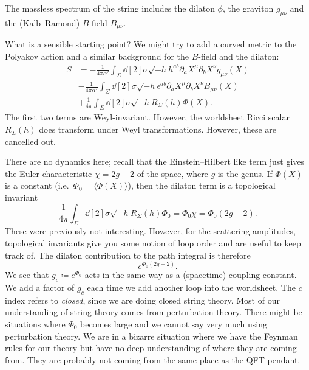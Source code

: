 The massless spectrum of the string includes the dilaton $\phi$, the graviton $g_{\mu\nu}$ and the (Kalb--Ramond) $B$-field $B_{\mu\nu}$.

What is a sensible starting point?
We might try to add a curved metric to the Polyakov action and a similar background for the $B$-field and the dilaton:
\begin{align}
  S &= -\frac{1}{4 \pi \alpha'} \int_\Sigma \dd[2]{\sigma} \sqrt{-h} h^{ab} \partial_{a} X^{\mu} \partial_{b} X^{\nu} g_{\mu\nu}(X) \\
    & -\frac{1}{4 \pi \alpha'} \int_{\Sigma} \dd[2]{\sigma} \sqrt{-h} \epsilon^{ab} \partial_{a} X^{\mu} \partial_{b} X^{\nu} B_{\mu\nu}(X) \\
    &+ \frac{1}{4 \pi} \int_{\Sigma} \dd[2]{\sigma} \sqrt{-h} R_{\Sigma}(h) \Phi(X).
\end{align}
The first two terms are Weyl-invariant. However, the worldsheet Ricci scalar $R_{\Sigma}(h)$ does transform under Weyl transformations. However, these are cancelled out.

There are no dynamics here; recall that the Einstein--Hilbert like term just gives the Euler characteristic $\chi = 2 g -2$ of the space, where $g$ is the genus.
If $\Phi(X)$ is a constant (i.e.~$\Phi_0 = \langle \Phi(X) \rangle$), then the dilaton term is a topological invariant
\begin{equation}
  \frac{1}{4 \pi} \int_{\Sigma} \dd[2]{\sigma} \sqrt{-h} R_{\Sigma}(h) \Phi_0 = \Phi_0 \chi = \Phi_0 (2 g - 2).
\end{equation}
These were previously not interesting.
However, for the scattering amplitudes, topological invariants give you some notion of loop order and are useful to keep track of.
The dilaton contribution to the path integral is therefore
\begin{equation}
  e^{\Phi_0 (2 g - 2)}.
\end{equation}
We see that $g_c \coloneqq e^{\Phi_0}$ acts in the same way as a (spacetime) coupling constant. We add a factor of $g_c$ each time we add another loop into the worldsheet.
The $c$ index refers to \emph{closed}, since we are doing closed string theory.
Most of our understanding of string theory comes from perturbation theory. There might be situations where $\Phi_0$ becomes large and we cannot say very much using perturbation theory.
We are in a bizarre situation where we have the Feynman rules for our theory but have no deep understanding of where they are coming from. They are probably not coming from the same place as the QFT pendant.

